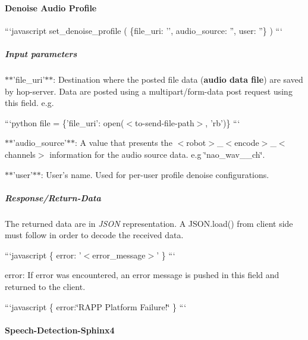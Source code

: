 \paragraph*{Denoise Audio Profile}

```javascript set\-\_\-denoise\-\_\-profile ( \{file\-\_\-uri\-: '', audio\-\_\-source\-: '', user\-: ''\} ) ```

\subparagraph*{Input parameters}


\begin{DoxyItemize}
\item $\ast$$\ast$'file\-\_\-uri'$\ast$$\ast$\-: Destination where the posted file data ({\bfseries audio data file}) are saved by hop-\/server. Data are posted using a multipart/form-\/data post request using this field. e.\-g.
\end{DoxyItemize}

```python file = \{'file\-\_\-uri'\-: open($<$to-\/send-\/file-\/path$>$, 'rb')\} ```


\begin{DoxyItemize}
\item $\ast$$\ast$'audio\-\_\-source'$\ast$$\ast$\-: A value that presents the $<$robot$>$\-\_\-$<$encode$>$\-\_\-$<$channels$>$ information for the audio source data. e.\-g \char`\"{}nao\-\_\-wav\-\_\-\_\-ch\char`\"{}.
\item $\ast$$\ast$'user'$\ast$$\ast$\-: User’s name. Used for per-\/user profile denoise configurations.
\end{DoxyItemize}

\subparagraph*{Response/\-Return-\/\-Data}

The returned data are in {\itshape J\-S\-O\-N} representation. A J\-S\-O\-N.\-load() from client side must follow in order to decode the received data.

```javascript \{ error\-: '$<$error\-\_\-message$>$' \} ```


\begin{DoxyItemize}
\item error\-: If error was encountered, an error message is pushed in this field and returned to the client.
\end{DoxyItemize}

```javascript \{ error\-:\char`\"{}\-R\-A\-P\-P Platform Failure!\char`\"{} \} ```

\paragraph*{Speech-\/\-Detection-\/\-Sphinx4}


